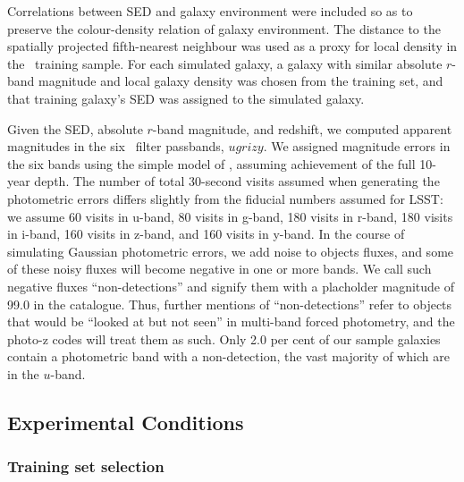 Correlations between SED and galaxy environment were included so as to preserve the colour-density relation of galaxy environment.
The distance to the spatially projected fifth-nearest neighbour was used as a proxy for local density in the \sdss\ training sample.
For each simulated galaxy, a galaxy with similar absolute $r$-band magnitude and local galaxy density was chosen from the training set, and that training galaxy's SED was assigned to the simulated galaxy.

Given the SED, absolute $r$-band magnitude, and redshift, we computed apparent magnitudes in the six \lsst\ filter passbands, $ugrizy$.
We assigned magnitude errors in the six bands using the simple model of \citet{Ivezic:08}, assuming achievement of the full 10-year depth.
The number of total 30-second visits assumed when generating the photometric errors differs slightly from the fiducial numbers assumed for LSST: we assume 60 visits in u-band, 80 visits in g-band, 180 visits in r-band, 180 visits in i-band, 160 visits in z-band, and 160 visits in y-band.
In the course of simulating Gaussian photometric errors, we add noise to objects fluxes, and some of these noisy fluxes will become negative in one or more bands.
We call such negative fluxes ``non-detections'' and signify them with a placholder magnitude of 99.0 in the catalogue.
Thus, further mentions of ``non-detections'' refer to objects that would be ``looked at but not seen'' in multi-band forced photometry, and the photo-z codes will treat them as such.
Only 2.0 per cent of our sample galaxies contain a photometric band with a non-detection, the vast majority of which are in the $u$-band.

\subsection{Experimental Conditions}
\label{sec:controlled}


\subsubsection{Training set selection}
\label{sec:buzztraining}

